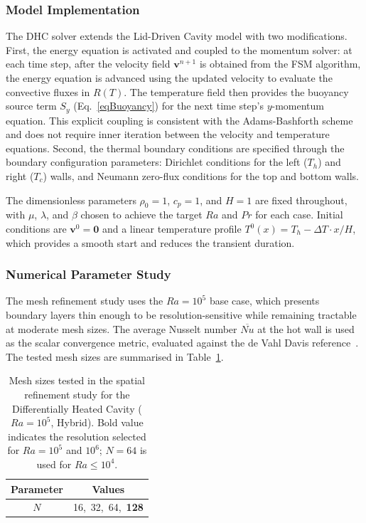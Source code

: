 \subsubsection{Model Implementation}

The DHC solver extends the Lid-Driven Cavity model with two modifications. First, the energy equation is activated and coupled to the momentum solver: at each time step, after the velocity field $\mathbf{v}^{n+1}$ is obtained from the FSM algorithm, the energy equation is advanced using the updated velocity to evaluate the convective fluxes in $R(T)$. The temperature field then provides the buoyancy source term $S_y$ (Eq.~\eqref{eqBuoyancy}) for the next time step's $y$-momentum equation. This explicit coupling is consistent with the Adams-Bashforth scheme and does not require inner iteration between the velocity and temperature equations. Second, the thermal boundary conditions are specified through the boundary configuration parameters: Dirichlet conditions for the left ($T_h$) and right ($T_c$) walls, and Neumann zero-flux conditions for the top and bottom walls.

The dimensionless parameters $\rho_0 = 1$, $c_p = 1$, and $H = 1$ are fixed throughout, with $\mu$, $\lambda$, and $\beta$ chosen to achieve the target $Ra$ and $Pr$ for each case. Initial conditions are $\mathbf{v}^0 = \mathbf{0}$ and a linear temperature profile $T^0(x) = T_h - \Delta T \cdot x / H$, which provides a smooth start and reduces the transient duration.


\subsubsection{Numerical Parameter Study}

The mesh refinement study uses the $Ra = 10^5$ base case, which presents boundary layers thin enough to be resolution-sensitive while remaining tractable at moderate mesh sizes. The average Nusselt number $\overline{Nu}$ at the hot wall is used as the scalar convergence metric, evaluated against the de Vahl Davis reference~\cite{deVahlDavis1983}. The tested mesh sizes are summarised in Table~\ref{tabDHCNumerical}.

\begin{table}[ht]
    \centering
    \begin{tabular}{|c|c|}
        \hline
        Parameter & Values \\
        \hline
        $N$ & 16,\ 32,\ 64,\ \textbf{128} \\
        \hline
    \end{tabular}
    \caption{Mesh sizes tested in the spatial refinement study for the Differentially Heated Cavity ($Ra = 10^5$, Hybrid). Bold value indicates the resolution selected for $Ra = 10^5$ and $10^6$; $N = 64$ is used for $Ra \leq 10^4$.}
    \label{tabDHCNumerical}
\end{table}

